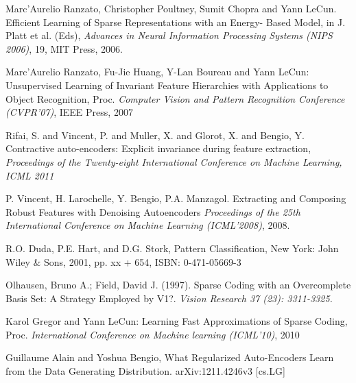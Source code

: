 \documentclass{article} %
\begin{document}
\begin{thebibliography}{1}

 Marc'Aurelio Ranzato, Christopher Poultney, Sumit Chopra and Yann LeCun. Efficient Learning of Sparse Representations with an Energy-	   Based Model, in J. Platt et al. (Eds), {\em Advances in Neural Information Processing Systems (NIPS 2006)}, 19, MIT Press, 2006.

 Marc'Aurelio Ranzato, Fu-Jie Huang, Y-Lan Boureau and Yann LeCun: Unsupervised Learning of Invariant Feature Hierarchies with Applications to Object Recognition, Proc. {\em Computer Vision and Pattern Recognition Conference (CVPR'07)}, IEEE Press, 2007
 
 Rifai, S. and Vincent, P. and Muller, X. and Glorot, X. and Bengio, Y. Contractive auto-encoders: Explicit invariance during feature extraction, {\em Proceedings of the Twenty-eight International Conference on Machine Learning,  ICML 2011}

 P. Vincent, H. Larochelle, Y. Bengio, P.A. Manzagol. Extracting and Composing Robust Features with Denoising Autoencoders
{\em Proceedings of the 25th International Conference on Machine Learning (ICML'2008)}, 2008.

 R.O. Duda, P.E. Hart, and D.G. Stork, Pattern Classification, New York: John Wiley \& Sons, 2001, pp. xx + 654, ISBN: 0-471-05669-3

 Olhausen, Bruno A.; Field, David J. (1997). Sparse Coding with an Overcomplete Basis Set: A Strategy Employed by V1?. {\em Vision Research 37 (23): 3311-3325.}

 Karol Gregor and Yann LeCun: Learning Fast Approximations of Sparse Coding, Proc. {\em International Conference on Machine learning (ICML'10)}, 2010

 Guillaume Alain and Yoshua Bengio, What Regularized Auto-Encoders Learn from the Data Generating Distribution. arXiv:1211.4246v3 [cs.LG] 

\end{thebibliography}
\end{document}
